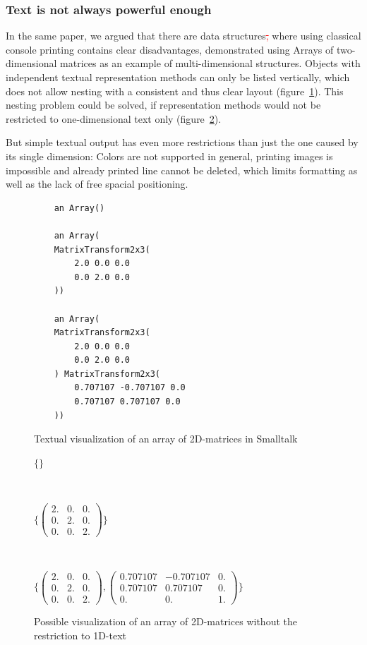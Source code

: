 \documentclass[english]{acm_proc_article-sp}
\newcommand{\del}[1]{\textcolor{red}{\sout{#1}}} %
\newcommand{\del}[1]{} %
\begin{document}
\subsubsection{Text is not always powerful enough}
In the same paper, we argued that there are data structures\del{,} where using classical console printing contains clear disadvantages, demonstrated using Arrays of two-dimensional matrices as an example of multi-dimensional structures. Objects with independent textual representation methods can only be listed vertically, which does not allow nesting with a consistent and thus clear layout (figure~\ref{nested-matrix-problem}). This nesting problem could be solved, if representation methods would not be restricted to one-dimensional text only (figure~\ref{nested-matrix-idea}).

But simple textual output has even more restrictions than just the one caused by its single dimension: Colors are not supported in general, printing images is impossible and already printed line cannot be deleted, which limits formatting as well as the lack of free spacial positioning.

\begin{figure}[h]
	\begin{verbatim}
    an Array()

    an Array(
    MatrixTransform2x3(
        2.0 0.0 0.0
        0.0 2.0 0.0
    ))

    an Array(
    MatrixTransform2x3(
        2.0 0.0 0.0
        0.0 2.0 0.0
    ) MatrixTransform2x3(
        0.707107 -0.707107 0.0
        0.707107 0.707107 0.0
    ))
	\end{verbatim}
	\caption[Bad nesting of 2D-matrix array]{Textual visualization of an array of 2D-matrices in Smalltalk}
	\label{nested-matrix-problem}
\end{figure}
\begin{figure}[h]
\raggedright
	$\{\}$
	\begin{verbatim}
	
	\end{verbatim}
	$\{\begin{pmatrix}
	2. & 0. & 0. \\
	0. & 2. & 0. \\
	0. & 0. & 2.
	\end{pmatrix}\}$
	\begin{verbatim}
	
	\end{verbatim}
	$\{\begin{pmatrix}
	2. & 0. & 0. \\
	0. & 2. & 0. \\
	0. & 0. & 2.
	\end{pmatrix},
	\begin{pmatrix}
	0.707107 & -0.707107 & 0. \\
	0.707107 & 0.707107 & 0. \\
	0. & 0. & 1.
	\end{pmatrix}\}$
	\caption[Ideal nesting of 2D-matrix array]{Possible visualization of an array of 2D-matrices without the restriction to 1D-text}
	\label{nested-matrix-idea}
\end{figure}
\end{document}
